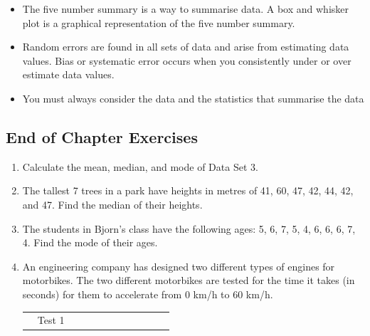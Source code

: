 \begin{description}[noitemsep]
\begin{description}[noitemsep]
\begin{itemize}[noitemsep, label=\textbullet{}]
        \item The five number summary is a way to summarise data. A box and whisker plot is a graphical representation of the five number summary.\item Random errors are found in all sets of data and arise from estimating data values. Bias or systematic error occurs when you consistently under or over estimate data values.\item You must always consider the data and the statistics that summarise the data\end{itemize}
    \label{m39404*cid10}
            \subsection{ End of Chapter Exercises}
            \nopagebreak
      \label{m39404*id216570}\begin{enumerate}[noitemsep, label=\textbf{\arabic*}. ] 
            \label{m39404*uid125}\item Calculate the mean, median, and mode of Data Set 3.\newline
\label{m39404*uid126}\item The tallest 7 trees in a park have heights in metres of 41, 60, 47, 42, 44, 42, and 47. Find the median of their heights.\newline
\label{m39404*uid127}\item The students in Bjorn's class have the following ages: 5, 6, 7, 5, 4, 6, 6, 6, 7, 4. Find the mode of their ages.\newline
\label{m39404*uid132}\item An engineering company has designed two different types of engines for motorbikes. The two different motorbikes are tested for the time it takes (in seconds) for them to accelerate from 0 km/h to 60 km/h.
          \begin{table}
        \begin{center}
      \label{m39404*id217268}
    \noindent
      \tablelasttail{}
      \begin{xtabular}[t]{|l|l|l|l|l|l|l|l|l|l|l|l|}\hline
         &
        Test 1 &

\end{xtabular}
\end{center}
\end{table}
\end{enumerate}
\end{description}
\end{description}
